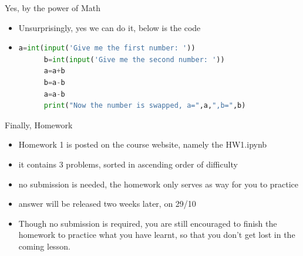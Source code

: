\documentclass[10pt,xcolor={table,dvipsnames},t]{beamer}
\begin{document}
\begin{frame}[fragile]{Yes, by the power of Math}
  \begin{itemize}
    \item Unsurprisingly, yes we can do it, below is the code
    \item \begin{lstlisting}[language=python]
      a=int(input('Give me the first number: '))
      b=int(input('Give me the second number: '))
      a=a+b
      b=a-b
      a=a-b
      print("Now the number is swapped, a=",a,",b=",b)\end{lstlisting}
  \end{itemize}
\end{frame}

\begin{frame}[fragile]{Finally, Homework}
  \begin{itemize}
    \item Homework 1 is posted on the course website, namely the HW1.ipynb
    \item it contains 3 problems, sorted in ascending order of difficulty
    \item no submission is needed, the homework only serves as way for you to practice
    \item answer will be released two weeks later, on 29/10
    \item Though no submission is required, you are still encouraged to finish the homework to practice what you have learnt, so that you don't get lost in the coming lesson.
  \end{itemize}
\end{frame}

\end{document}
